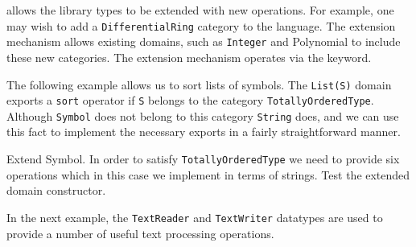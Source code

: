 \newpage
{}


\asharp{} allows the library types to be extended with new
operations. For example, one may wish to add a {\tt DifferentialRing}
category to the language. The extension mechanism allows existing
domains, such as {\tt Integer} and {Polynomial} to include these new
categories. The extension mechanism operates via the  
keyword.

The following example allows us to sort lists of symbols.  The {\tt List(S)}
domain exports a {\tt sort} operator if {\tt S} belongs to the category
{\tt TotallyOrderedType}.  Although {\tt Symbol} does not belong to this category
{\tt String} does, and we can use this fact to implement the necessary
exports in a fairly straightforward manner.


\begin{description}
 Extend Symbol. In order to satisfy {\tt TotallyOrderedType} we need
to provide six operations which in this case we implement in terms of
strings.
 Test the extended domain constructor.
\end{description}

\newpage
{}

In the next example, the \asharp{} {\tt TextReader} and
{\tt TextWriter} { datatypes}
are used to provide a number of useful text processing operations. 


